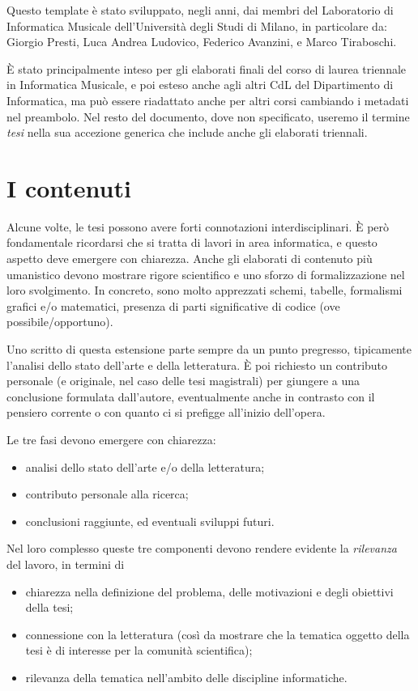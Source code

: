 \documentclass[12pt]{report}
\begin{document}
    Questo template è stato sviluppato, negli anni, dai membri del Laboratorio di Informatica Musicale dell'Università degli Studi di Milano, in particolare da: Giorgio Presti, Luca Andrea Ludovico, Federico Avanzini, e Marco Tiraboschi.

    È stato principalmente inteso per gli elaborati finali del corso di laurea triennale in Informatica Musicale, e poi esteso anche agli altri CdL del Dipartimento di Informatica, ma può essere riadattato anche per altri corsi cambiando i metadati nel preambolo. Nel resto del documento, dove non specificato, useremo il termine \textit{tesi} nella sua accezione generica che include anche gli elaborati triennali.

    \section{I contenuti}
    \label{sec:contenuti}

    Alcune volte, le tesi possono avere forti connotazioni interdisciplinari. \`{E} però fondamentale ricordarsi che si tratta di lavori in area informatica, e questo aspetto deve emergere con chiarezza. Anche gli elaborati di contenuto più umanistico devono mostrare rigore scientifico e uno sforzo di formalizzazione nel loro svolgimento. In concreto, sono molto apprezzati schemi, tabelle, formalismi grafici e/o matematici, presenza di parti significative di codice (ove possibile/opportuno).

    Uno scritto di questa estensione parte sempre da un punto pregresso, tipicamente l'analisi dello stato dell'arte e della letteratura. \`{E} poi richiesto un contributo personale (e originale, nel caso delle tesi magistrali) per giungere a una conclusione formulata dall'autore, eventualmente anche in contrasto con il pensiero corrente o con quanto ci si prefigge all'inizio dell'opera.

    Le tre fasi devono emergere con chiarezza:
    \begin{itemize}
        \item analisi dello stato dell'arte e/o della letteratura;
        \item contributo personale alla ricerca;
        \item conclusioni raggiunte, ed eventuali sviluppi futuri.
    \end{itemize}

    Nel loro complesso queste tre componenti devono rendere evidente la {\em rilevanza} del lavoro, in termini di
    \begin{itemize}
        \item chiarezza nella definizione del problema, delle motivazioni e degli obiettivi della tesi;
        \item connessione con la letteratura (cos\`i da mostrare che la tematica oggetto della tesi \`e di interesse per la comunit\`a scientifica);
        \item rilevanza della tematica nell'ambito delle discipline informatiche.
    \end{itemize}
\end{document}
